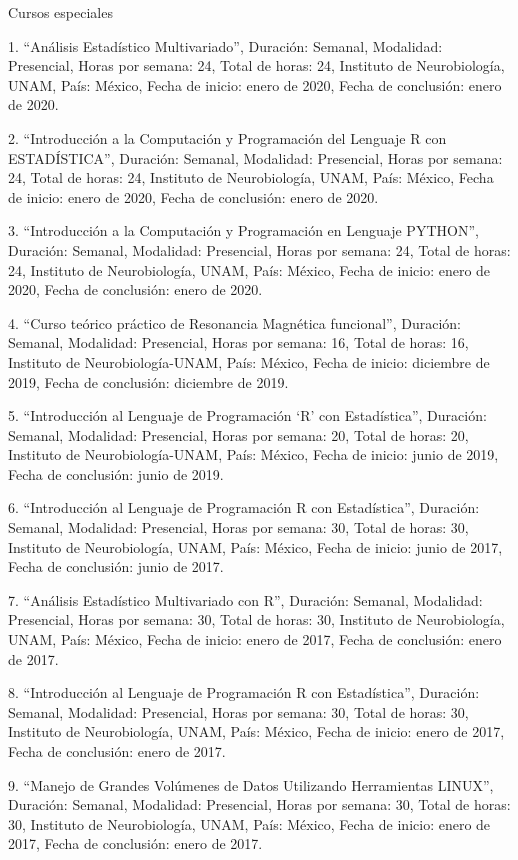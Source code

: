 \documentclass[12pt]{article}
\begin{document}
Cursos especiales

1. “Análisis Estadístico Multivariado”, Duración: Semanal, Modalidad: Presencial, Horas por semana: 24, Total de horas: 24, Instituto 
de Neurobiología, UNAM, País: México, Fecha de inicio: enero de 2020, Fecha de conclusión: enero de 2020.

2. “Introducción a la Computación y Programación del Lenguaje R con ESTADÍSTICA”, Duración: Semanal, Modalidad: Presencial, Horas por 
semana: 24, Total de horas: 24, Instituto de Neurobiología, UNAM, País: México, Fecha de inicio: enero de 2020, Fecha de conclusión: 
enero de 2020.

3. “Introducción a la Computación y Programación en Lenguaje PYTHON”, Duración: Semanal, Modalidad: Presencial, Horas por semana: 24, 
Total de horas: 24, Instituto de Neurobiología, UNAM, País: México, Fecha de inicio: enero de 2020, Fecha de conclusión: enero de 2020.

4. “Curso teórico práctico de Resonancia Magnética funcional”, Duración: Semanal, Modalidad: Presencial, Horas por semana: 16, Total de 
horas: 16, Instituto de Neurobiología-UNAM, País: México, Fecha de inicio: 
diciembre de 2019, Fecha de conclusión: diciembre de 2019.

5. “Introducción al Lenguaje de Programación ‘R’ con Estadística”, Duración: Semanal, Modalidad: Presencial, Horas por semana: 20, 
Total de horas: 20, Instituto de Neurobiología-UNAM, País: México, Fecha de inicio: junio de 2019, Fecha de conclusión: junio de 2019.

6. “Introducción al Lenguaje de Programación R con Estadística”, Duración: Semanal, Modalidad: Presencial, Horas por semana: 30, Total 
de horas: 30, Instituto de Neurobiología, UNAM, País: México, Fecha de inicio: junio de 2017, Fecha de conclusión: junio de 2017.

7. “Análisis Estadístico Multivariado con R”, Duración: Semanal, Modalidad: Presencial, Horas por semana: 30, Total de horas: 30, 
Instituto de Neurobiología, UNAM, País: México, Fecha de inicio: enero de 2017, Fecha de conclusión: enero de 2017.

8. “Introducción al Lenguaje de Programación R con Estadística”, Duración: Semanal, Modalidad: Presencial, Horas por semana: 30, Total 
de horas: 30, Instituto de Neurobiología, UNAM, País: México, Fecha de inicio: enero de 2017, Fecha de conclusión: enero de 2017.

9. “Manejo de Grandes Volúmenes de Datos Utilizando Herramientas LINUX”, Duración: Semanal, Modalidad: Presencial, Horas por semana: 
30, Total de horas: 30, Instituto de Neurobiología, UNAM, País: México, Fecha de inicio: enero de 2017, Fecha de conclusión: enero de 
2017.
\end{document}
